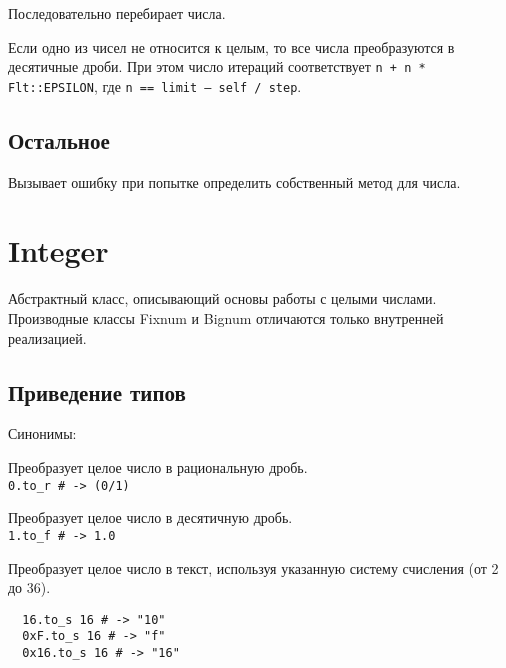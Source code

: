 \begin{methodlist}
  Последовательно перебирает числа.

  Если одно из чисел не относится к целым, то все числа преобразуются в десятичные дроби. При этом число итераций соответствует \verb!n + n * Flt::EPSILON!, где \verb!n == limit – self / step!.
\end{methodlist}

\subsection*{Остальное}

\begin{methodlist}
  Вызывает ошибку при попытке определить собственный метод для числа.
\end{methodlist}

\section{Integer}

Абстрактный класс, описывающий основы работы с целыми числами. Производные классы Fixnum и Bignum отличаются только внутренней реализацией.

\subsection*{Приведение типов}

\begin{methodlist}

  Синонимы: 

  Преобразует целое число в рациональную дробь.
  \\\verb!0.to_r # -> (0/1)!

  Преобразует целое число в десятичную дробь.
  \\\verb!1.to_f # -> 1.0!

  Преобразует целое число в текст, используя указанную систему счисления (от 2 до 36).
  \begin{verbatim}
  16.to_s 16 # -> "10"
  0xF.to_s 16 # -> "f" 
  0x16.to_s 16 # -> "16" 
  \end{verbatim}
\end{methodlist}

